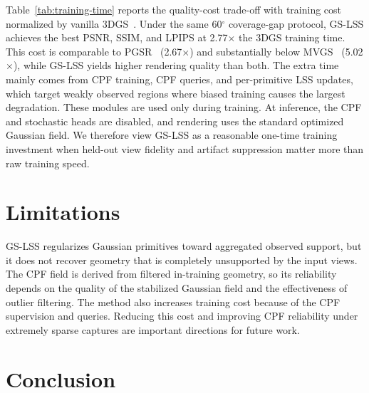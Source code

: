 \documentclass[lettersize,journal]{IEEEtran}
\begin{document}
Table~\ref{tab:training-time} reports the quality-cost trade-off with training cost normalized by vanilla 3DGS~\cite{3dgs}. 
Under the same 60$^\circ$ coverage-gap protocol, GS-LSS achieves the best PSNR, SSIM, and LPIPS at 2.77$\times$ the 3DGS training time. 
This cost is comparable to PGSR~\cite{pgsr} (2.67$\times$) and substantially below MVGS~\cite{mvgs} (5.02$\times$), while GS-LSS yields higher rendering quality than both. 
The extra time mainly comes from CPF training, CPF queries, and per-primitive LSS updates, which target weakly observed regions where biased training causes the largest degradation. 
These modules are used only during training. At inference, the CPF and stochastic heads are disabled, and rendering uses the standard optimized Gaussian field. 
We therefore view GS-LSS as a reasonable one-time training investment when held-out view fidelity and artifact suppression matter more than raw training speed.


\section{Limitations}

GS-LSS regularizes Gaussian primitives toward aggregated observed support, but it does not recover geometry that is completely unsupported by the input views. The CPF field is derived from filtered in-training geometry, so its reliability depends on the quality of the stabilized Gaussian field and the effectiveness of outlier filtering. The method also increases training cost because of the CPF supervision and queries. Reducing this cost and improving CPF reliability under extremely sparse captures are important directions for future work.


\section{Conclusion}

\end{document}
